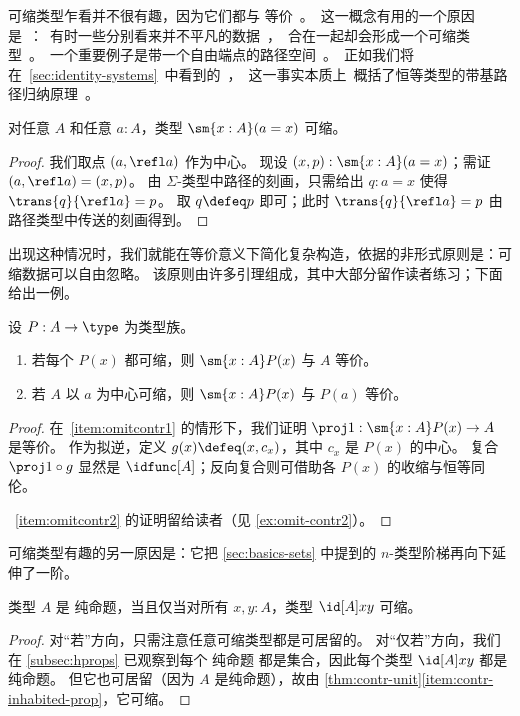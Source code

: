 可缩类型乍看并不很有趣，因为它们都与 \unit 等价。
这一概念有用的一个原因是：有时一些分别看来并不平凡的数据，合在一起却会形成一个可缩类型。
一个重要例子是带一个自由端点的路径空间。
正如我们将在 \cref{sec:identity-systems} 中看到的，这一事实本质上
概括了恒等类型的带基路径归纳原理。


\begin{lem}\label{thm:contr-paths}
  对任意 $A$ 和任意 $a:A$，类型 $\sm{x:A} (a=x)$ 可缩。
\end{lem}
\begin{proof}
  我们取点 $(a,\refl a)$ 作为中心。
  现设 $(x,p):\sm{x:A}(a=x)$；需证 $(a,\refl a) = (x,p)$。
  由 $\Sigma$-类型中路径的刻画，只需给出 $q:a=x$ 使得 $\trans{q}{\refl a} = p$。
  取 $q\defeq p$ 即可；此时 $\trans{q}{\refl a} = p$ 由路径类型中传送的刻画得到。
\end{proof}

出现这种情况时，我们就能在等价意义下简化复杂构造，依据的非形式原则是：可缩数据可以自由忽略。
该原则由许多引理组成，其中大部分留作读者练习；下面给出一例。

\begin{lem}\label{thm:omit-contr}
  设 $P:A\to\type$ 为类型族。
  \begin{enumerate}
  \item 若每个 $P(x)$ 都可缩，则 $\sm{x:A} P(x)$ 与 $A$ 等价。\label{item:omitcontr1}
  \item 若 $A$ 以 $a$ 为中心可缩，则 $\sm{x:A} P(x)$ 与 $P(a)$ 等价。\label{item:omitcontr2}
  \end{enumerate}
\end{lem}
\begin{proof}
  在~\ref{item:omitcontr1} 的情形下，我们证明 $\proj1:\sm{x:A} P(x) \to A$ 是等价。
  作为拟逆，定义 $g(x)\defeq (x,c_x)$，其中 $c_x$ 是 $P(x)$ 的中心。
  复合 $\proj1 \circ g$ 显然是 $\idfunc[A]$；反向复合则可借助各 $P(x)$ 的收缩与恒等同伦。

  ~\ref{item:omitcontr2} 的证明留给读者（见 \cref{ex:omit-contr2}）。
\end{proof}

可缩类型有趣的另一原因是：它把 \cref{sec:basics-sets} 中提到的 $n$-类型阶梯再向下延伸了一阶。

\begin{lem}\label{thm:prop-minusonetype}
  类型 $A$ 是 纯命题，当且仅当对所有 $x,y:A$，类型 $\id[A]xy$ 可缩。
\end{lem}
\begin{proof}
  对“若”方向，只需注意任意可缩类型都是可居留的。
  对“仅若”方向，我们在 \cref{subsec:hprops} 已观察到每个 纯命题 都是集合，因此每个类型 $\id[A]xy$ 都是 纯命题。
  但它也可居留（因为 $A$ 是纯命题），故由 \cref{thm:contr-unit}\ref{item:contr-inhabited-prop}，它可缩。
\end{proof}

